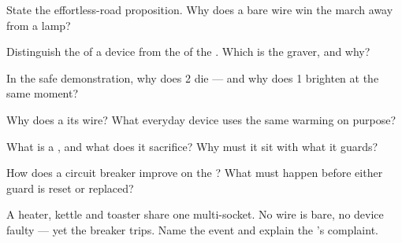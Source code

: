 \begin{exercise}[$\star$]\label{exo:g7:short-circuits-safety:1}
State the effortless-road proposition. Why does a bare wire win
the march away from a lamp?
\end{exercise}

\begin{exercise}[$\star$]\label{exo:g7:short-circuits-safety:2}
Distinguish the  of a device from the 
of the . Which is the graver, and why?
\end{exercise}

\begin{exercise}[$\star$]\label{exo:g7:short-circuits-safety:3}
In the safe demonstration, why does  2 die --- and why does
 1 brighten at the same moment?
\end{exercise}

\begin{exercise}[$\star$]\label{exo:g7:short-circuits-safety:4}
Why does a   its wire? What everyday device
uses the same warming on purpose?
\end{exercise}

\begin{exercise}[$\star$]\label{exo:g7:short-circuits-safety:5}
What is a , and what does it sacrifice? Why must it sit  with what it guards?
\end{exercise}

\begin{exercise}[$\star$]\label{exo:g7:short-circuits-safety:6}
How does a circuit breaker improve on the ? What must happen
before either guard is reset or replaced?
\end{exercise}

\begin{exercise}[$\star$]\label{exo:g7:short-circuits-safety:7}
A heater, kettle and toaster share one multi-socket. No wire is
bare, no device faulty --- yet the breaker trips. Name the event
and explain the 's complaint.
\end{exercise}

